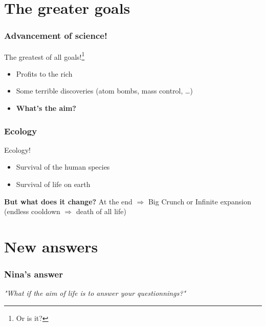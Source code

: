 \documentclass{beamer}
\begin{document}
	\section{The greater goals}    
    
    \begin{frame}
    		\frametitle{Advancement of science!}
    		
    		The greatest of all goals!\footnote{Or is it?}
    		\begin{itemize}
    			\item Profits to the rich
    			\item Some terrible discoveries (atom bombs, mass control, \dots)
    			\item \textbf{What's the aim?}
    		\end{itemize}
    \end{frame}
    
    \begin{frame}
    		\frametitle{Ecology}
    		
    		Ecology!
    		\begin{itemize}
    			\item Survival of the human species 
    			\item Survival of life on earth
    		\end{itemize}
    		
    		\textbf{But what does it change?} At the end $\Rightarrow$ Big Crunch or Infinite expansion (endless cooldown $\Rightarrow$ death of all life)
    		
    		
    \end{frame}
    
    \section{New answers} %
    \begin{frame}
    		\frametitle{Nina's answer}
    		
    		\textit{"What if the aim of life is to answer your questionnings?"}
    \end{frame}
    
\end{document}
